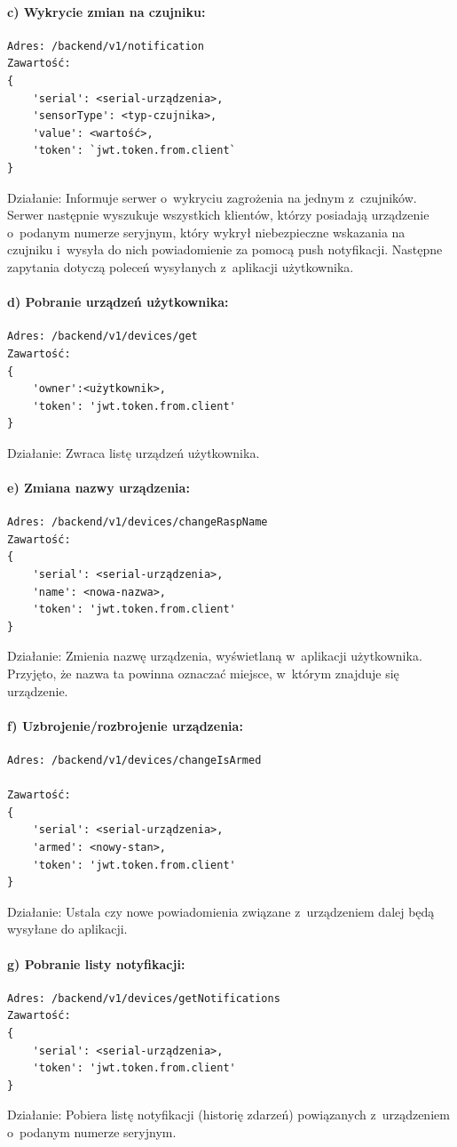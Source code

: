 \paragraph{c) Wykrycie zmian na czujniku:}
\begin{verbatim}
Adres: /backend/v1/notification
Zawartość: 
{
	'serial': <serial-urządzenia>, 
	'sensorType': <typ-czujnika>, 
	'value': <wartość>, 
	'token': `jwt.token.from.client`
}
\end{verbatim}
Działanie: Informuje serwer o~wykryciu zagrożenia na jednym z~czujników. Serwer następnie wyszukuje wszystkich klientów, którzy posiadają urządzenie o~podanym numerze seryjnym, który wykrył niebezpieczne wskazania na czujniku i~wysyła do nich powiadomienie za pomocą push notyfikacji. \newline
Następne zapytania dotyczą poleceń wysyłanych z~aplikacji użytkownika.
\paragraph{d) Pobranie urządzeń użytkownika:}
\begin{verbatim}
Adres: /backend/v1/devices/get
Zawartość: 
{
	'owner':<użytkownik>, 
	'token': 'jwt.token.from.client'
}
\end{verbatim}
Działanie: Zwraca listę urządzeń użytkownika.
\paragraph{e) Zmiana nazwy urządzenia:}
\begin{verbatim}
Adres: /backend/v1/devices/changeRaspName
Zawartość:
{
	'serial': <serial-urządzenia>, 
	'name': <nowa-nazwa>, 
	'token': 'jwt.token.from.client'
}
\end{verbatim}
Działanie: Zmienia nazwę urządzenia, wyświetlaną w~aplikacji użytkownika. Przyjęto, że nazwa ta powinna oznaczać miejsce, w~którym znajduje się urządzenie.
\paragraph{f) Uzbrojenie/rozbrojenie urządzenia:}
\begin{verbatim}
Adres: /backend/v1/devices/changeIsArmed

Zawartość: 
{
	'serial': <serial-urządzenia>, 
	'armed': <nowy-stan>, 
	'token': 'jwt.token.from.client'
}
\end{verbatim}
Działanie: Ustala czy nowe powiadomienia związane z~urządzeniem dalej będą wysyłane do aplikacji.
\paragraph{g) Pobranie listy notyfikacji:}
\begin{verbatim}
Adres: /backend/v1/devices/getNotifications
Zawartość: 
{
	'serial': <serial-urządzenia>,  
	'token': 'jwt.token.from.client'
}
\end{verbatim}
Działanie: Pobiera listę notyfikacji (historię zdarzeń) powiązanych z~urządzeniem o~podanym numerze seryjnym.
